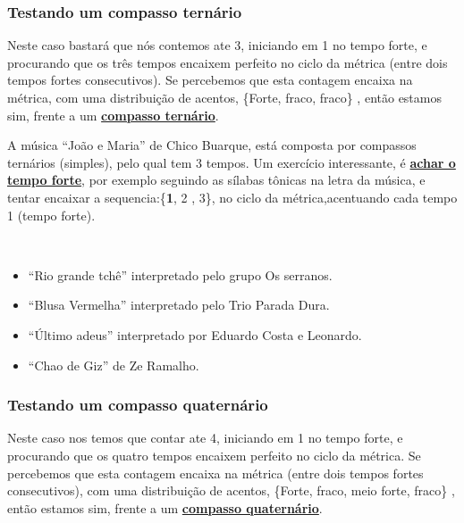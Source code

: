 \subsubsection{Testando um compasso ternário}
Neste caso bastará que nós contemos ate 3, iniciando em 1 no tempo forte,
e procurando que os três tempos encaixem perfeito no ciclo da métrica (entre dois tempos fortes consecutivos).
Se percebemos que esta contagem encaixa na métrica,
com uma distribuição de acentos, \{Forte, fraco, fraco\} \cite[pp. 10]{wright1992social}, 
então estamos sim, frente a um  \hyperref[subsec:compassoternario]{\textbf{compasso ternário}}.

\begin{example}
\label{ex:compassosimples3t}
A música ``João e Maria'' de Chico Buarque,
está composta por compassos ternários (simples), pelo qual tem 3 tempos.
Um exercício interessante, é \hyperref[subsec:perceberTF1]{\textbf{achar o tempo forte}},
por exemplo seguindo as sílabas tônicas na letra da música,
e tentar encaixar a sequencia:\{\textbf{1}, 2 , 3\}, no ciclo da métrica,acentuando cada tempo 1 (tempo forte). 
\end{example}

\begin{example}
\label{ex:compassosimples3t2}
~
\begin{itemize}
\item ``Rio grande tchê'' interpretado pelo grupo Os serranos.
\item ``Blusa Vermelha'' interpretado pelo Trio Parada Dura.
\item ``Último adeus'' interpretado por Eduardo Costa e Leonardo.
\item ``Chao de Giz'' de Ze Ramalho.
\end{itemize}
\end{example}

\subsubsection{Testando um compasso quaternário}
Neste caso nos temos que contar ate 4, iniciando em 1 no tempo forte,
e procurando que os quatro tempos encaixem perfeito no ciclo da métrica.
Se percebemos que esta contagem encaixa na métrica (entre dois tempos fortes consecutivos),
com uma distribuição de acentos, \{Forte, fraco, meio forte, fraco\} \cite[pp. 10]{wright1992social}, 
então estamos sim, frente a um  \hyperref[subsec:compassoquaternario]{\textbf{compasso quaternário}}.


